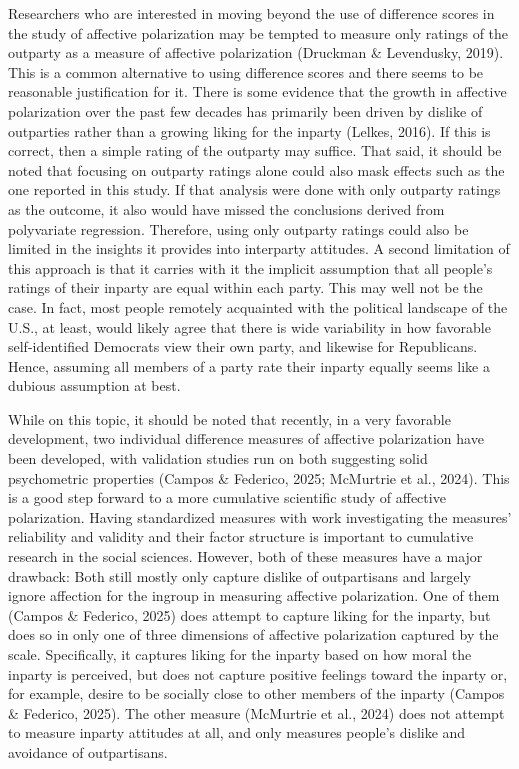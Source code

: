 \documentclass[authordate, meta]{jote-new-article}
\begin{document}
	Researchers who are interested in moving beyond the use of difference scores in the study of affective polarization may be tempted to measure only ratings of the outparty as a measure of affective polarization (Druckman \& Levendusky, 2019). This is a common alternative to using difference scores and there seems to be reasonable justification for it. There is some evidence that the growth in affective polarization over the past few decades has primarily been driven by dislike of outparties rather than a growing liking for the inparty (Lelkes, 2016). If this is correct, then a simple rating of the outparty may suffice. That said, it should be noted that focusing on outparty ratings alone could also mask effects such as the one reported in this study. If that analysis were done with only outparty ratings as the outcome, it also would have missed the conclusions derived from polyvariate regression. Therefore, using only outparty ratings could also be limited in the insights it provides into interparty attitudes. A second limitation of this approach is that it carries with it the implicit assumption that all people's ratings of their inparty are equal within each party. This may well not be the case. In fact, most people remotely acquainted with the political landscape of the U.S., at least, would likely agree that there is wide variability in how favorable self-identified Democrats view their own party, and likewise for Republicans. Hence, assuming all members of a party rate their inparty equally seems like a dubious assumption at best.



	While on this topic, it should be noted that recently, in a very favorable development, two individual difference measures of affective polarization have been developed, with validation studies run on both suggesting solid psychometric properties (Campos \& Federico, 2025; McMurtrie et al., 2024). This is a good step forward to a more cumulative scientific study of affective polarization. Having standardized measures with work investigating the measures' reliability and validity and their factor structure is important to cumulative research in the social sciences. However, both of these measures have a major drawback: Both still mostly only capture dislike of outpartisans and largely ignore affection for the ingroup in measuring affective polarization. One of them (Campos \& Federico, 2025) does attempt to capture liking for the inparty, but does so in only one of three dimensions of affective polarization captured by the scale. Specifically, it captures liking for the inparty based on how moral the inparty is perceived, but does not capture positive feelings toward the inparty or, for example, desire to be socially close to other members of the inparty (Campos \& Federico, 2025). The other measure (McMurtrie et al., 2024) does not attempt to measure inparty attitudes at all, and only measures people's dislike and avoidance of outpartisans.
\end{document}
